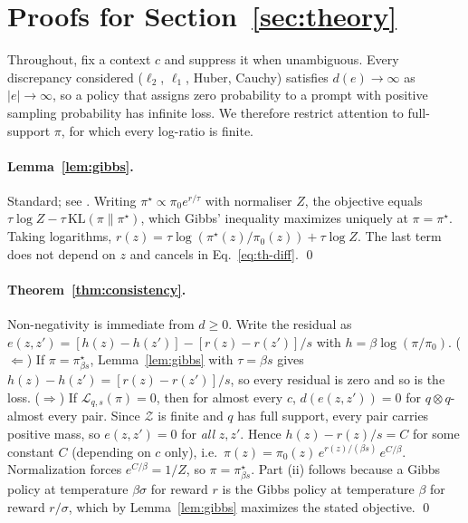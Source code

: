 \appendix

\section{Proofs for Section~\ref{sec:theory}}
\label{app:proofs}

Throughout, fix a context $c$ and suppress it when unambiguous. Every
discrepancy considered ($\ell_2$, $\ell_1$, Huber, Cauchy) satisfies
$d(e)\to\infty$ as $|e|\to\infty$, so a policy that assigns zero probability to
a prompt with positive sampling probability has infinite loss. We therefore
restrict attention to full-support $\pi$, for which every log-ratio is finite.

\paragraph{Lemma~\ref{lem:gibbs}.}
Standard; see \citet[App.~A.1]{rafailov2023dpo}. Writing
$\pi^\star \propto \pi_0 e^{r/\tau}$ with normaliser $Z$, the objective equals
$\tau\log Z - \tau\,\mathrm{KL}(\pi\|\pi^\star)$, which Gibbs' inequality
maximizes uniquely at $\pi = \pi^\star$. Taking logarithms,
$r(z) = \tau\log(\pi^\star(z)/\pi_0(z)) + \tau\log Z$. The last term does not
depend on $z$ and cancels in Eq.~\eqref{eq:th-diff}. \qed

\paragraph{Theorem~\ref{thm:consistency}.}
Non-negativity is immediate from $d \ge 0$. Write the residual as
$e(z,z') = [h(z) - h(z')] - [r(z) - r(z')]/s$ with
$h = \beta\log(\pi/\pi_0)$.
($\Leftarrow$) If $\pi = \pi^\star_{\beta s}$, Lemma~\ref{lem:gibbs} with
$\tau = \beta s$ gives $h(z) - h(z') = [r(z) - r(z')]/s$, so every residual is
zero and so is the loss.
($\Rightarrow$) If $\mathcal{L}_{q,s}(\pi) = 0$, then for almost every $c$,
$d(e(z,z')) = 0$ for $q\otimes q$-almost every pair. Since $\mathcal{Z}$ is
finite and $q$ has full support, every pair carries positive mass, so
$e(z,z') = 0$ for \emph{all} $z,z'$. Hence $h(z) - r(z)/s = C$ for some constant
$C$ (depending on $c$ only), i.e.\
$\pi(z) = \pi_0(z)\,e^{r(z)/(\beta s)}\,e^{C/\beta}$. Normalization forces
$e^{C/\beta} = 1/Z$, so $\pi = \pi^\star_{\beta s}$.
Part (ii) follows because a Gibbs policy at temperature $\beta\sigma$ for reward
$r$ is the Gibbs policy at temperature $\beta$ for reward $r/\sigma$, which by
Lemma~\ref{lem:gibbs} maximizes the stated objective. \qed

